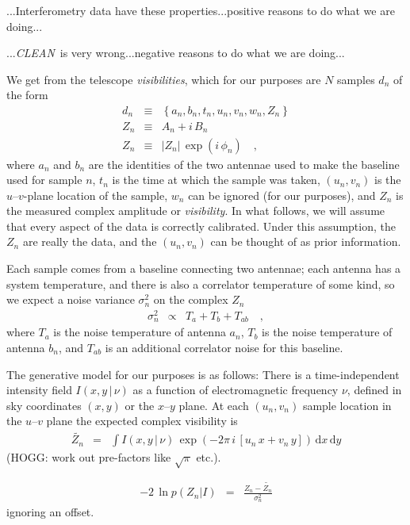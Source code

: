 \documentclass[12pt]{article}
\newcommand{\project}[1]{\textsl{#1}}
\newcommand{\CLEAN}{\project{CLEAN}}
\newcommand{\set}[1]{\left\{{#1}\right\}}
\newcommand{\given}{\,|\,}
\newcommand{\expectation}[1]{\tilde{#1}}
\newcommand{\dd}{\mathrm{d}}
\begin{document}
...Interferometry data have these properties...positive reasons to do
what we are doing...

...\CLEAN\ is very wrong...negative reasons to do what we are doing...

We get from the telescope \emph{visibilities}, which for our purposes
are $N$ samples $d_n$ of the form
\begin{eqnarray}
d_n &\equiv& \set{a_n, b_n, t_n, u_n, v_n, w_n, Z_n}
\\
Z_n &\equiv& A_n + i\,B_n
\\
Z_n &\equiv& \left|Z_n\right|\,\exp(i\,\phi_n)
\quad,
\end{eqnarray}
where $a_n$ and $b_n$ are the identities of the two antennae used to
make the baseline used for sample $n$, $t_n$ is the time at which the
sample was taken, $(u_n, v_n)$ is the $u$--$v$-plane location of the
sample, $w_n$ can be ignored (for our purposes), and $Z_n$ is the
measured complex amplitude or \emph{visibility}.  In what follows, we
will assume that every aspect of the data is correctly calibrated.
Under this assumption, the $Z_n$ are really the data, and the $(u_n,
v_n)$ can be thought of as prior information.

Each sample comes from a baseline connecting two antennae; each
antenna has a system temperature, and there is also a correlator
temperature of some kind, so we expect a noise variance $\sigma_n^2$
on the complex $Z_n$
\begin{eqnarray}
\sigma_n^2 &\propto& T_a + T_b + T_{ab}
\quad ,
\end{eqnarray}
where $T_a$ is the noise temperature of antenna $a_n$, $T_b$ is the
noise temperature of antenna $b_n$, and $T_{ab}$ is an additional
correlator noise for this baseline.

The generative model for our purposes is as follows: There is a
time-independent intensity field $I(x,y\given\nu)$ as a function of
electromagnetic frequency $\nu$, defined in sky coordinates $(x,y)$ or
the $x$--$y$ plane.  At each $(u_n, v_n)$ sample location in the
$u$--$v$ plane the expected complex visibility is
\begin{eqnarray}
\expectation{Z_n} &=& \int I(x,y\given\nu)\,\exp(-2\pi\,i\,[u_n\,x + v_n\,y])\,\dd x\,\dd y
\end{eqnarray}
(HOGG: work out pre-factors like $\sqrt{\pi}$ etc.).

\begin{eqnarray}
-2\,\ln p(Z_n|I) &=& \frac{Z_n - \expectation{Z_n}}{\sigma_n^2}
\end{eqnarray}
ignoring an offset.
\end{document}
